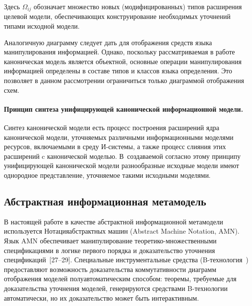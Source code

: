 \begin{multicols}{2}
Здесь $\Omega_{ij}$ обозначает множество новых (модифицированных)
типов расширения целевой модели, обеспечивающих конструирование
необходимых уточнений типами исходной модели.

Аналогичную диаграмму следует дать для отоб\-ра\-жения средств языка
манипулирования информацией. Однако, поскольку рассматриваемая в работе
каноническая модель является объектной, основные операции
манипулирования информацией определены в составе типов и классов языка
определения. Это позволяет в данном рассмотрении ограничиться только
диаграммой отображения схем.

\paragraph*{Принцип синтеза унифицирующей канонической информационной
модели.}Синтез канонической модели есть процесс построения
расширений ядра канонической модели, уточняемых различными
информационными моделями ресурсов, включаемыми в среду И-системы, а
также процесс слияния этих расширений c канонической моделью.
В~соз\-да\-ва\-емой согласно этому принципу унифицирующей канонической модели
разнообразные исходные модели имеют однородное представление,
уточняемое такими исходными моделями.

\subsection{Абстрактная информационная метамодель}

В настоящей работе в качестве абстрактной информационной метамодели
используется Нотация\linebreak абстрактных машин (Abstract Machine Notation, AMN). Язык
AMN обеспечивает манипулирование теоретико-множественными спецификациями в
логике первого порядка и доказательство уточнения спецификаций~[27--29].
Специальные инструментальные средства (B-технология~\cite{Ab93})\linebreak
предоставляют возможность доказательства коммутативности диаграмм
отображения моделей полуавтоматическим способом: теоремы, требуемые
для доказательства уточнения моделей, генерируются средствами
B-тех\-но\-ло\-гии автоматически,
но их доказательство может быть интерактивным.


\end{multicols}
